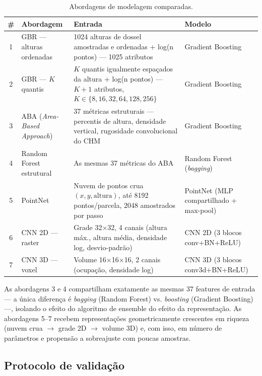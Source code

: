 \begin{table}[H]
  \centering
  \caption{Abordagens de modelagem comparadas.}
  \label{tab:modelos}
  \small
  \begin{tabular}{clp{5.2cm}p{3.2cm}}
    \toprule
    \textbf{\#} & \textbf{Abordagem} & \textbf{Entrada} & \textbf{Modelo} \\
    \midrule
    1 & GBR --- alturas ordenadas & 1024 alturas de dossel amostradas e ordenadas
      + log(n pontos) --- 1025 atributos & Gradient Boosting \\
    2 & GBR --- $K$ quantis & $K$ quantis igualmente espaçados da altura +
      log(n pontos) --- $K{+}1$ atributos, $K \in \{8,16,32,64,128,256\}$ &
      Gradient Boosting \\
    3 & ABA (\textit{Area-Based Approach}) & 37 métricas estruturais --- percentis
      de altura, densidade vertical, rugosidade convolucional do CHM &
      Gradient Boosting \\
    4 & Random Forest estrutural & As mesmas 37 métricas do ABA &
      Random Forest (\textit{bagging}) \\
    5 & PointNet & Nuvem de pontos crua $(x, y, \text{altura})$, até 8192
      pontos/parcela, 2048 amostrados por passo & PointNet (MLP compartilhado +
      max-pool) \\
    6 & CNN 2D --- raster & Grade 32$\times$32, 4 canais (altura máx., altura
      média, densidade log, desvio-padrão) & CNN 2D (3 blocos conv+BN+ReLU) \\
    7 & CNN 3D --- voxel & Volume 16$\times$16$\times$16, 2 canais (ocupação,
      densidade log) & CNN 3D (3 blocos conv3d+BN+ReLU) \\
    \bottomrule
  \end{tabular}
\end{table}

As abordagens 3 e 4 compartilham exatamente as mesmas 37 features de entrada ---
a única diferença é \textit{bagging} (Random Forest) vs. \textit{boosting}
(Gradient Boosting) ---, isolando o efeito do algoritmo de ensemble do efeito da
representação. As abordagens 5--7 recebem representações geometricamente
crescentes em riqueza (nuvem crua $\rightarrow$ grade 2D $\rightarrow$ volume 3D)
e, com isso, em número de parâmetros e propensão a sobreajuste com poucas
amostras.

\subsection{Protocolo de validação}
\label{sec:protocolo}

